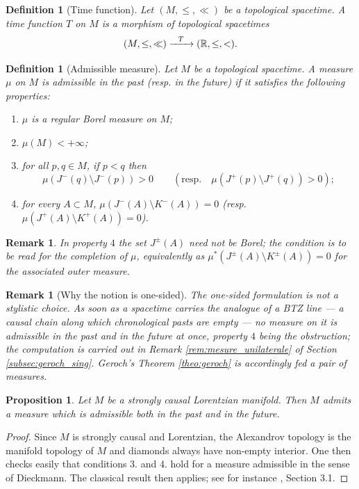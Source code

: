 \documentclass[a4paper,twoside]{article}
\newtheorem{prop}[lem]{Proposition}
\newtheorem{defi}[lem]{Definition}
\newtheorem{rem}[lem]{Remark}
\begin{document}
\begin{defi}[Time function] \label{defi:fonction_temps}Let $(M,\leq,\ll)$ be a topological spacetime. A time function $T$ on $M$ is a morphism of topological spacetimes
$$(M,\leq,\ll)\xrightarrow{~~T~~}(\mathbb R,\leq,<).$$
\end{defi}

\begin{defi}[Admissible measure]\label{defi:mesure_dieckmann} Let $M$ be a topological spacetime. A measure $\mu$ on $M$ is admissible \emph{in the past} (resp. \emph{in the future})
if it satisfies the following properties:
\begin{enumerate}
\item $\mu$ is a regular Borel measure on $M$;
\item $\mu(M)<+\infty$;
\item for all $p,q\in M$, if $p<q$ then
$$\mu(J^-(q)\setminus J^-(p))>0 \qquad \left(\text{resp.}\quad  \mu(J^+(p)\setminus J^+(q))>0\right) ; $$
\item for every $A \subset M$, $\mu(J^-(A)\setminus K^-(A))=0$ \quad (resp. $\mu(J^+(A)\setminus K^+(A))=0$).
\end{enumerate}
\end{defi}
\begin{rem}\label{rem:mesure_bord}
In property $4$ the set $J^\pm(A)$ need not be Borel; the condition is to be read for the completion of $\mu$, equivalently as $\mu^*\left(J^\pm(A)\setminus K^\pm(A)\right)=0$ for the associated outer measure.
\end{rem}
\begin{rem}[Why the notion is one-sided]\label{rem:mesure_unilaterale_ptr}
The one-sided formulation is not a stylistic choice. As soon as a spacetime carries the analogue of
a BTZ line --- a causal chain along which chronological pasts are empty --- no measure on it is
admissible in the past and in the future at once, property $4$ being the obstruction; the
computation is carried out in Remark \ref{rem:mesure_unilaterale} of Section
\ref{subsec:geroch_sing}. Geroch's Theorem \ref{theo:geroch} is accordingly fed a \emph{pair} of
measures.
\end{rem}

\begin{prop}\label{prop:mesure_dieckmann_Lorentz} Let $M$ be a strongly causal Lorentzian manifold. Then $M$ admits a measure which is admissible both in the past and in the future.
\end{prop}
\begin{proof}
Since $M$ is strongly causal and Lorentzian, the Alexandrov topology is the manifold topology of $M$
and diamonds always have non-empty interior.
One then checks easily that conditions $3.$ and $4.$ hold for a measure admissible in the sense of
Dieckmann. The classical result then applies; see for instance \cite{MR2196783}, Section 3.1.
\end{proof}
\end{document}
